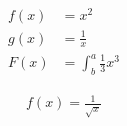 \documentclass{article}
\begin{document}

\begin{align*}
f(x) &= x ^ 2 \\
g(x) &= \frac{1}{x} \\
F(x) &= \int^a_b \frac{1}{3}x^3
\end{align*}

\begin{align*}
f(x) = \frac{1}{\sqrt{x}}
\end{align*}
\end{document}
